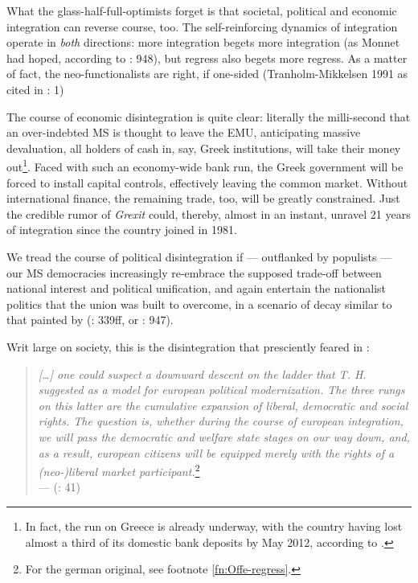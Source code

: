 What the glass-half-full-optimists forget is that societal, political and economic integration can reverse course, too. The self-reinforcing dynamics of integration operate in \emph{both} directions: more integration begets more integration (as Monnet had hoped, according to \citealt{Schmitter1999}: 948), but regress also begets more regress. As a matter of fact, the neo-functionalists are right, if one-sided (Tranholm-Mikkelsen 1991 as cited in \citealt{Bieler2003}: 1)

The course of economic disintegration is quite clear: literally the milli-second that an over-indebted \gls{MS} is thought to leave the \gls{EMU}, anticipating massive devaluation, all holders of cash in, say, Greek institutions, will take their money out\footnote{
	In fact, the run on Greece is already underway, with the country having lost almost a third of its domestic bank deposits by May 2012, according to \cite{TheEconomist2012}.}. 
Faced with such an economy-wide bank run, the Greek government will be forced to install capital controls, effectively leaving the common market. Without international finance, the remaining trade, too, will be greatly constrained. Just the credible rumor of \emph{Grexit} could, thereby, almost in an instant, unravel 21 years of integration since the country joined in 1981.

We tread the course of political disintegration if --- outflanked by populists --- our \gls{MS} democracies increasingly re-embrace the supposed trade-off between national interest and political unification, and again entertain the nationalist politics that the union was built to overcome, in a scenario of decay similar to that painted by \citeauthor{BeckGrande-2007-aa} (\citeauthor{BeckGrande-2007-aa}: 339ff, or \citealt{Schmitter1999}: 947).

Writ large on society, this is the disintegration that \citeauthor{Offe1998} presciently feared in \citeyear{Offe1998}:
\begin{quote}
	\emph{[\ldots] one could suspect a downward descent on the ladder that T. H. \cite{Marshall-1950-aa} suggested as a model for european political modernization. The three rungs on this latter are the cumulative expansion of liberal, democratic and social rights. The question is, whether during the course of european integration, we will pass the democratic and welfare state stages on our way down, and, as a result, european citizens will be equipped merely with the rights of a (neo-)liberal market participant.}\footnote{
		For the german original, see footnote \ref{fn:Offe-regress}.}\\
	--- \citeauthor{Offe1998} (\citeyear{Offe1998}: 41)
\end{quote}

